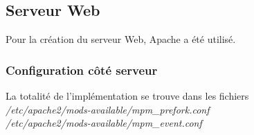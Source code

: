 \subsection{Serveur Web}
\label{subsec:serveur-web}

Pour la création du serveur Web, Apache a été utilisé.

\subsubsection{Configuration côté serveur}
\label{subsubsec:config-serveur}

La totalité de l'implémentation se trouve dans les fichiers \\
\textit{/etc/apache2/mods-available/mpm\_prefork.conf} \\
\textit{/etc/apache2/mods-available/mpm\_event.conf}

